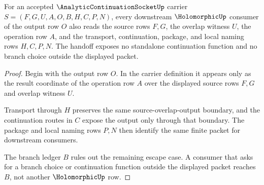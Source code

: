 \begin{theorem}
\label{thm:analytic-continuation-socket-holomorphic-handoff}
For an accepted $\AnalyticContinuationSocketUp$ carrier $S=(F,G,U,A,O,B,H,C,P,N)$, every downstream $\HolomorphicUp$ consumer of the output row $O$ also reads the source rows $F,G$, the overlap witness $U$, the operation row $A$, and the transport, continuation, package, and local naming rows $H,C,P,N$. The handoff exposes no standalone continuation function and no branch choice outside the displayed packet.
\end{theorem}
\begin{proof}
Begin with the output row $O$. In the carrier definition it appears only as the result coordinate of the operation row $A$ over the displayed source rows $F,G$ and overlap witness $U$.

Transport through $H$ preserves the same source-overlap-output boundary, and the continuation routes in $C$ expose the output only through that boundary. The package and local naming rows $P,N$ then identify the same finite packet for downstream consumers.

The branch ledger $B$ rules out the remaining escape case. A consumer that asks for a branch choice or continuation function outside the displayed packet reaches $B$, not another $\HolomorphicUp$ row.
\end{proof}


